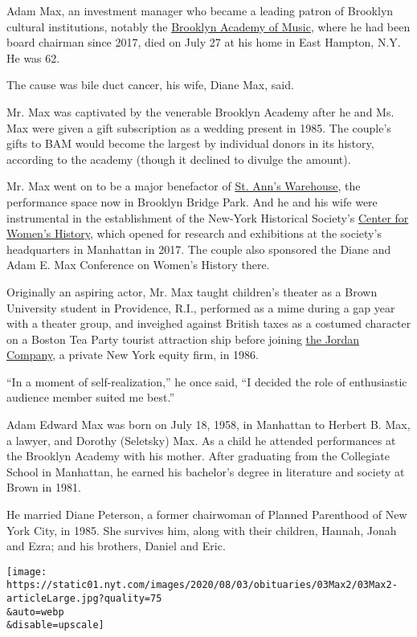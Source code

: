 Adam Max, an investment manager who became a leading patron of Brooklyn
cultural institutions, notably the \href{https://www.bam.org/}{Brooklyn
Academy of Music}, where he had been board chairman since 2017, died on
July 27 at his home in East Hampton, N.Y. He was 62.

The cause was bile duct cancer, his wife, Diane Max, said.

Mr. Max was captivated by the venerable Brooklyn Academy after he and
Ms. Max were given a gift subscription as a wedding present in 1985. The
couple's gifts to BAM would become the largest by individual donors in
its history, according to the academy (though it declined to divulge the
amount).

Mr. Max went on to be a major benefactor of
\href{https://stannswarehouse.org/}{St. Ann's Warehouse}, the
performance space now in Brooklyn Bridge Park. And he and his wife were
instrumental in the establishment of the New-York Historical Society's
\href{https://www.nyhistory.org/womens-history}{Center for Women's
History}, which opened for research and exhibitions at the society's
headquarters in Manhattan in 2017. The couple also sponsored the Diane
and Adam E. Max Conference on Women's History there.

Originally an aspiring actor, Mr. Max taught children's theater as a
Brown University student in Providence, R.I., performed as a mime during
a gap year with a theater group, and inveighed against British taxes as
a costumed character on a Boston Tea Party tourist attraction ship
before joining \href{https://www.thejordancompany.com/}{the Jordan
Company}, a private New York equity firm, in 1986.

``In a moment of self-realization,'' he once said, ``I decided the role
of enthusiastic audience member suited me best.''

Adam Edward Max was born on July 18, 1958, in Manhattan to Herbert B.
Max, a lawyer, and Dorothy (Seletsky) Max. As a child he attended
performances at the Brooklyn Academy with his mother. After graduating
from the Collegiate School in Manhattan, he earned his bachelor's degree
in literature and society at Brown in 1981.

He married Diane Peterson, a former chairwoman of Planned Parenthood of
New York City, in 1985. She survives him, along with their children,
Hannah, Jonah and Ezra; and his brothers, Daniel and Eric.

\texttt{[image: https://static01.nyt.com/images/2020/08/03/obituaries/03Max2/03Max2-articleLarge.jpg?quality=75\\\&auto=webp\\\&disable=upscale]}

